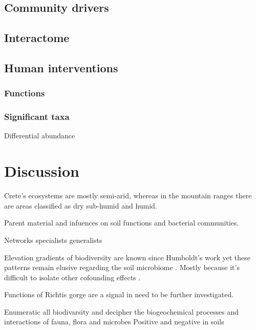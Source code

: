 \documentclass[unnumsec,webpdf,contemporary,large]{oup-authoring-template}%
\theoremstyle{thmstyleone}%
\theoremstyle{thmstyletwo}%
\theoremstyle{thmstylethree}%
\begin{document}
\subsection{Community drivers}\label{Drivers}

\subsection{Interactome}\label{interactome}

\subsection{Human interventions}\label{Human interventions}

\subsubsection{Functions}\label{functions}

\subsubsection{Significant taxa}\label{sig_taxa}

Differential abundance

\section{Discussion}\label{discussion}

Crete's ecosystems are mostly semi-arid, whereas in the mountain ranges there 
are areas classified as dry sub-humid and humid. 

Parent material and infuences on soil functions and bacterial communities.

Networks specialists generalists \cite{Barberan2012}

Elevation gradients of biodiversity are known since Humboldt's work \cite{Rahbek2019} 
yet these patterns remain elusive regarding the soil microbiome \cite{Looby2020, Siles2023}.
Mostly because it's difficult to isolate other cofounding effects \cite{Nottingham2018}. 

Functions of Richtis gorge are a signal in need to be further investigated.

Enumeratic all biodivarsity \cite{Anthony2023} and decipher the biogeochemical 
processes and interactions of fauna, flora and microbes \cite{Fry2019, Crowther2019,GRANDY201640,Delgado-Baquerizo2020}
Positive and negative in soils \cite{Liu2024}
\end{document}
